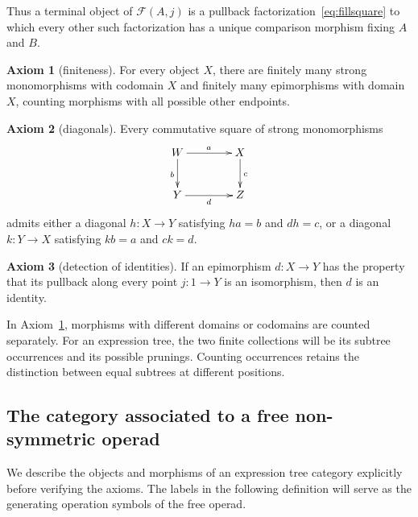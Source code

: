 \documentclass[11pt,a4paper]{article}
\theoremstyle{plain}
\theoremstyle{definition}
\newtheorem{axiom}{Axiom}
\theoremstyle{remark}
\newcommand{\one}{1}
\newcommand{\Fill}{\mathcal F}
\begin{document}
Thus a terminal object of $\Fill(A,j)$ is a pullback
factorization~\eqref{eq:fillsquare} to which every other such
factorization has a unique comparison morphism fixing $A$ and
$B$.

\begin{axiom}[finiteness]\label{ax:finite}
For every object $X$, there are finitely many strong monomorphisms
with codomain $X$ and finitely many epimorphisms with domain $X$,
counting morphisms with all possible other endpoints.
\end{axiom}

\begin{axiom}[diagonals]\label{ax:O}
Every commutative square of strong monomorphisms
\[
\xymatrix@C=4em@R=2.5em{
W \ar[r]^{a} \ar[d]_{b} & X \ar[d]^{c} \\
Y \ar[r]_{d} & Z
}
\]
admits either a diagonal $h:X\to Y$ satisfying $ha=b$ and $dh=c$,
or a diagonal $k:Y\to X$ satisfying $kb=a$ and $ck=d$.
\end{axiom}

\begin{axiom}[detection of identities]\label{ax:Ddetect}
If an epimorphism $d:X\to Y$ has the property that its pullback along
every point $j:\one\to Y$ is an isomorphism, then $d$ is an identity.
\end{axiom}


In Axiom~\ref{ax:finite}, morphisms with different domains or
codomains are counted separately. For an expression tree, the two
finite collections will be its subtree occurrences and its possible
prunings. Counting occurrences retains the distinction between
equal subtrees at different positions.

\subsection{The category associated to a free non-symmetric operad}\label{sec:model}
We describe the objects and morphisms of an expression tree category
explicitly before verifying the axioms. The labels in the following
definition will serve as the generating operation symbols of the
free operad.
\end{document}

